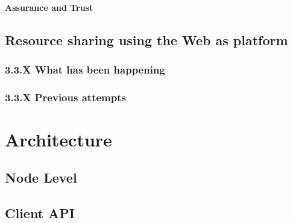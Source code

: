 \documentclass{./llncs2e/llncs}
\begin{document}

\paragraph{Assurance and Trust} %
\label{par:Assurance and Trust}









% 
% 
\subsection{Resource sharing using the Web as platform} 


\subsubsection{3.3.X What has been happening}

\subsubsection{3.3.X Previous attempts}






% 
% 

\section{Architecture}


\subsection{Node Level}

\subsection{Client API}
\end{document}

